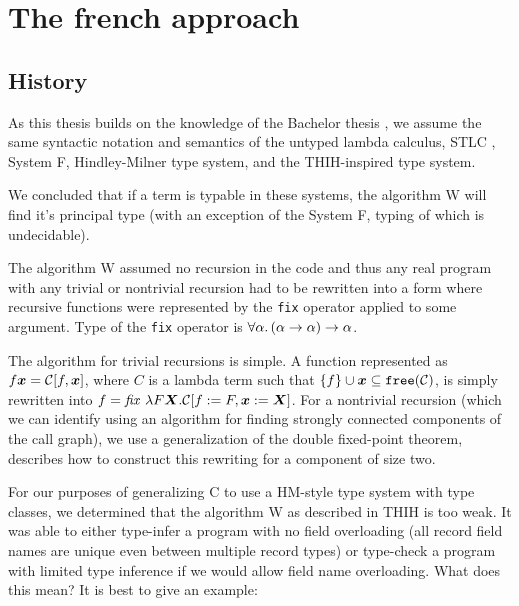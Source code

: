\providecommand{\free}[1]{\mtt{free} (#1)}
\providecommand{\dom}[1]{\mtt{Dom} (#1)}
\providecommand{\ran}[1]{\mtt{Ran} (#1)}

\chapter{The french approach}


\section{History }

As this thesis builds on the knowledge of the Bachelor thesis , we assume the same syntactic notation and semantics of the untyped lambda calculus, STLC , System F, Hindley-Milner type system, and the THIH-inspired type system.

We concluded that if a term is typable in these systems, the algorithm W will find it's principal type (with an exception of the System F, typing of which is undecidable).

The algorithm W assumed no recursion in the code and thus any real program with any trivial or nontrivial recursion had to be rewritten into a form where recursive functions were represented by the \lstinline{fix} operator applied to some argument. Type of the \lstinline{fix} operator is $\forall \alpha . \left(\alpha \to \alpha\right) \to \alpha$.

The algorithm for trivial recursions is simple. A function represented as $f \bm{x} = \mathcal{C}[f, \bm{x}]$, where $C$ is a lambda term such that $\{f\} \cup \bm{x} \subseteq \free \calC$, is simply rewritten into $f = \mathit{fix}\ \lambda F \bm{X} .\mathcal{C}[f := F, \bm{x} := \bm{X}]$. For a nontrivial recursion (which we can identify using an algorithm for finding strongly connected components of the call graph), we use a generalization of the double fixed-point  theorem, describes how to construct this rewriting for a component of size two.

For our purposes of generalizing C to use a HM-style type system with type classes, we determined that the algorithm W as described in THIH is too weak. It was able to either type-infer a program with no field overloading (all record field names are unique even between multiple record types) or type-check a program with limited type inference if we would allow field name overloading. What does this mean? It is best to give an example:

